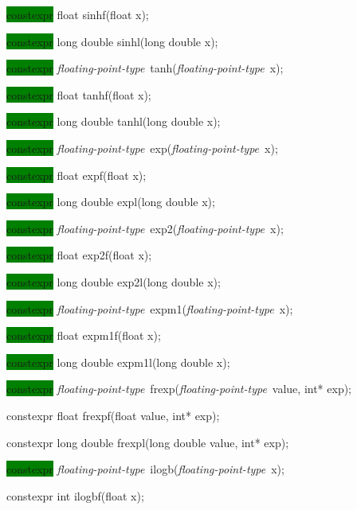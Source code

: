 \documentclass[prd,twocolumn,amsmath,amssymb,nofootinbib,eqsecnum]{revtex4-1}
\newcommand{\highlight}[1]{\colorbox{green}{\!\!\!\! #1}}
\newcommand{\oldhighlight}[1]{#1}
\newcommand{\fptype}{{\it floating-point-type}}
\begin{document}
{\highlight{constexpr} float sinhf(float x);

\highlight{constexpr} long double sinhl(long double x);

\vspace{2ex}


\highlight{constexpr} \fptype\ tanh(\fptype\ x);

\highlight{constexpr} float tanhf(float x);

\highlight{constexpr} long double tanhl(long double x);

\vspace{2ex}


\highlight{constexpr} \fptype\ exp(\fptype\ x);

\highlight{constexpr} float expf(float x);

\highlight{constexpr} long double expl(long double x);

\vspace{2ex}


\highlight{constexpr} \fptype\ exp2(\fptype\ x);

\highlight{constexpr} float exp2f(float x);

\highlight{constexpr} long double exp2l(long double x);

\vspace{2ex}


\highlight{constexpr} \fptype\ expm1(\fptype\ x);

\highlight{constexpr} float expm1f(float x);

\highlight{constexpr} long double expm1l(long double x);

\vspace{2ex}


\highlight{constexpr} \fptype\ frexp(\fptype\ value, int* exp);

\oldhighlight{constexpr}  float frexpf(float value, int* exp);

\oldhighlight{constexpr}  long double frexpl(long double value, int* exp);

\vspace{2ex}


\highlight{constexpr} \fptype\ ilogb(\fptype\ x);

\oldhighlight{constexpr} int ilogbf(float x);

}
\end{document}
